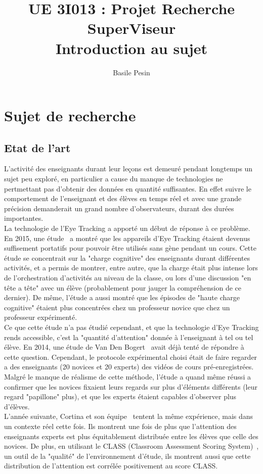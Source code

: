 \documentclass{article}
\title{UE 3I013 : Projet Recherche\\
    SuperViseur\\
    Introduction au sujet}
\author{Basile Pesin}
\begin{document}
\maketitle
\newpage

\section{Sujet de recherche}
\subsection{Etat de l'art}
L'activité des enseignants durant leur leçons est demeuré pendant longtemps un sujet peu exploré, en particulier a cause du manque de technologies ne pertmettant pas d'obtenir des données en quantité suffisantes. En effet suivre le comportement de l'enseignant et des élèves en temps réel et avec une grande précision demanderait un grand nombre d'observateurs, durant des durées importantes.\\
La technologie de l'Eye Tracking a apporté un début de réponse à ce problème. En 2015, une étude~\cite{OrchestrationLoad} a montré que les appareils d'Eye Tracking étaient devenus suffisement portatifs pour pouvoir être utilisés sans gène pendant un cours. Cette étude se concentrait sur la "charge cognitive" des enseignants durant différentes activités, et a permis de montrer, entre autre, que la charge était plus intense lors de l'orchestration d'activités au niveau de la classe, ou lors d'une discussion "en tête a tête" avec un élève (probablement pour jauger la compréhension de ce dernier). De même, l'étude a aussi montré que les épisodes de "haute charge cognitive" étaient plus concentrées chez un professeur novice que chez un professeur expérimenté.\\
Ce que cette étude n'a pas étudié cependant, et que la technologie d'Eye Tracking rends accessible, c'est la "quantité d'attention" donnée à l'enseignant à tel ou tel élève. En 2014, une étude de Van Den Bogert~\cite{VanDenBogert} avait déjà tenté de répondre à cette question. Cependant, le protocole expérimental choisi était de faire regarder a des enseignants (20 novices et 20 experts) des vidéos de cours pré-enregistrées. Malgré le manque de réalisme de cette méthode, l'étude a quand même réussi a confirmer que les novices fixaient leurs regards sur plus d'éléments différents (leur regard "papillone" plus), et que les experts étaient capables d'observer plus d'élèves.\\
L'année suivante, Cortina et son équipe~\cite{Cortina} tentent la même expérience, mais dans un contexte réel cette fois. Ils montrent une fois de plus que l'attention des enseignants experts est plus équitablement distribuée entre les élèves que celle des novices. De plus, en utilisant le CLASS (Classroom Assessment Scoring System)~\cite{CLASS}, un outil de la "qualité" de l'environnement d'étude, ils montrent aussi que cette distribution de l'attention est corrélée positivement au score CLASS.\\
\end{document}
